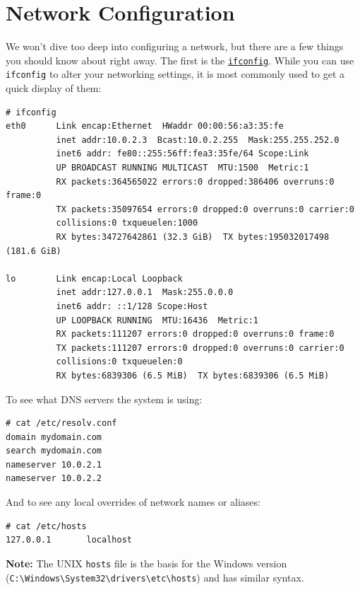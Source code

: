 \documentclass[10pt,]{book}
\numberwithin{figure}{chapter}
\begin{document}
\section{Network Configuration}\label{network-configuration}

We won't dive too deep into configuring a network, but there are a few
things you should know about right away. The first is the
\href{http://linux.die.net/man/8/ifconfig}{\texttt{ifconfig}}. While you
can use \texttt{ifconfig} to alter your networking settings, it is most
commonly used to get a quick display of them:

\begin{verbatim}
# ifconfig
eth0      Link encap:Ethernet  HWaddr 00:00:56:a3:35:fe
          inet addr:10.0.2.3  Bcast:10.0.2.255  Mask:255.255.252.0
          inet6 addr: fe80::255:56ff:fea3:35fe/64 Scope:Link
          UP BROADCAST RUNNING MULTICAST  MTU:1500  Metric:1
          RX packets:364565022 errors:0 dropped:386406 overruns:0 frame:0
          TX packets:35097654 errors:0 dropped:0 overruns:0 carrier:0
          collisions:0 txqueuelen:1000
          RX bytes:34727642861 (32.3 GiB)  TX bytes:195032017498 (181.6 GiB)

lo        Link encap:Local Loopback
          inet addr:127.0.0.1  Mask:255.0.0.0
          inet6 addr: ::1/128 Scope:Host
          UP LOOPBACK RUNNING  MTU:16436  Metric:1
          RX packets:111207 errors:0 dropped:0 overruns:0 frame:0
          TX packets:111207 errors:0 dropped:0 overruns:0 carrier:0
          collisions:0 txqueuelen:0
          RX bytes:6839306 (6.5 MiB)  TX bytes:6839306 (6.5 MiB)
\end{verbatim}

To see what DNS servers the system is using:

\begin{verbatim}
# cat /etc/resolv.conf
domain mydomain.com
search mydomain.com
nameserver 10.0.2.1
nameserver 10.0.2.2
\end{verbatim}

And to see any local overrides of network names or aliases:

\begin{verbatim}
# cat /etc/hosts
127.0.0.1       localhost
\end{verbatim}

\textbf{Note:} The UNIX \texttt{hosts} file is the basis for the Windows
version \linebreak
(\texttt{C:\textbackslash{}Windows\textbackslash{}System32\textbackslash{}drivers\textbackslash{}etc\textbackslash{}hosts})
and has similar syntax.
\end{document}
